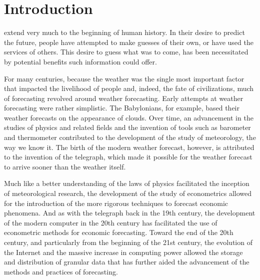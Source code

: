 \documentclass{tufte-book}
\title[Educated Guess]{
	\usebox{\titleimage}
	
	\vspace{-0.5in}
	
	\setlength{\parindent}{20pt}%
	An Intuitive Guide to Forecasting\\
	With Time Series Models Using R
	}
\author{David Ubilava}
\date{October 2022}
\begin{document}
	
	\frontmatter
	
	\maketitle
	
	\tableofcontents
	
	\listoffigures
	
	\listoftables
	
	
	\mainmatter
	
	\chapter{Introduction}
	\label{c1}
	
	 extend very much to the beginning of human history. In their desire to predict the future, people have attempted to make guesses of their own, or have used the services of others. This desire to guess what was to come, has been necessitated by potential benefits such information could offer. 
	
	For many centuries, because the weather was the single most important factor that impacted the livelihood of people and, indeed, the fate of civilizations, much of forecasting revolved around weather forecasting. Early attempts at weather forecasting were rather simplistic. The Babylonians, for example, based their weather forecasts on the appearance of clouds. Over time, an advancement in the studies of physics and related fields and the invention of tools such as barometer and thermometer contributed to the development of the study of meteorology, the way we know it. The birth of the modern weather forecast, however, is attributed to the invention of the telegraph, which made it possible for the weather forecast to arrive sooner than the weather itself. 
	
	Much like a better understanding of the laws of physics facilitated the inception of meteorological research, the development of the study of econometrics allowed for the introduction of the more rigorous techniques to forecast economic phenomena. And as with the telegraph back in the 19th century, the development of the modern computer in the 20th century has facilitated the use of econometric methods for economic forecasting. Toward the end of the 20th century, and particularly from the beginning of the 21st century, the evolution of the Internet and the massive increase in computing power allowed the storage and distribution of granular data that has further aided the advancement of the methods and practices of forecasting. 
	
\end{document}
